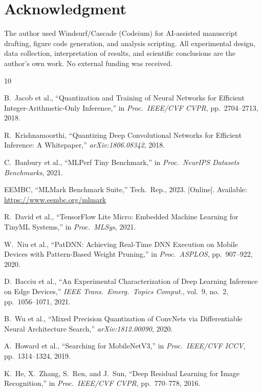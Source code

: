 \documentclass[journal]{IEEEtran}
\begin{document}
\section*{Acknowledgment}

The author used Windsurf/Cascade (Codeium) for AI-assisted manuscript drafting, figure code generation, and analysis scripting. All experimental design, data collection, interpretation of results, and scientific conclusions are the author's own work. No external funding was received.

\begin{thebibliography}{10}

B.~Jacob et al., ``Quantization and Training of Neural Networks for Efficient Integer-Arithmetic-Only Inference,'' in \emph{Proc.\ IEEE/CVF CVPR}, pp.~2704--2713, 2018.

R.~Krishnamoorthi, ``Quantizing Deep Convolutional Networks for Efficient Inference: A Whitepaper,'' \emph{arXiv:1806.08342}, 2018.

C.~Banbury et al., ``MLPerf Tiny Benchmark,'' in \emph{Proc.\ NeurIPS Datasets Benchmarks}, 2021.

EEMBC, ``MLMark Benchmark Suite,'' Tech.\ Rep., 2023. [Online]. Available: \url{https://www.eembc.org/mlmark}

R.~David et al., ``TensorFlow Lite Micro: Embedded Machine Learning for TinyML Systems,'' in \emph{Proc.\ MLSys}, 2021.

W.~Niu et al., ``PatDNN: Achieving Real-Time DNN Execution on Mobile Devices with Pattern-Based Weight Pruning,'' in \emph{Proc.\ ASPLOS}, pp.~907--922, 2020.

D.~Bacciu et al., ``An Experimental Characterization of Deep Learning Inference on Edge Devices,'' \emph{IEEE Trans.\ Emerg.\ Topics Comput.}, vol.~9, no.~2, pp.~1056--1071, 2021.

B.~Wu et al., ``Mixed Precision Quantization of ConvNets via Differentiable Neural Architecture Search,'' \emph{arXiv:1812.00090}, 2020.

A.~Howard et al., ``Searching for MobileNetV3,'' in \emph{Proc.\ IEEE/CVF ICCV}, pp.~1314--1324, 2019.

K.~He, X.~Zhang, S.~Ren, and J.~Sun, ``Deep Residual Learning for Image Recognition,'' in \emph{Proc.\ IEEE/CVF CVPR}, pp.~770--778, 2016.

\end{thebibliography}
\end{document}
